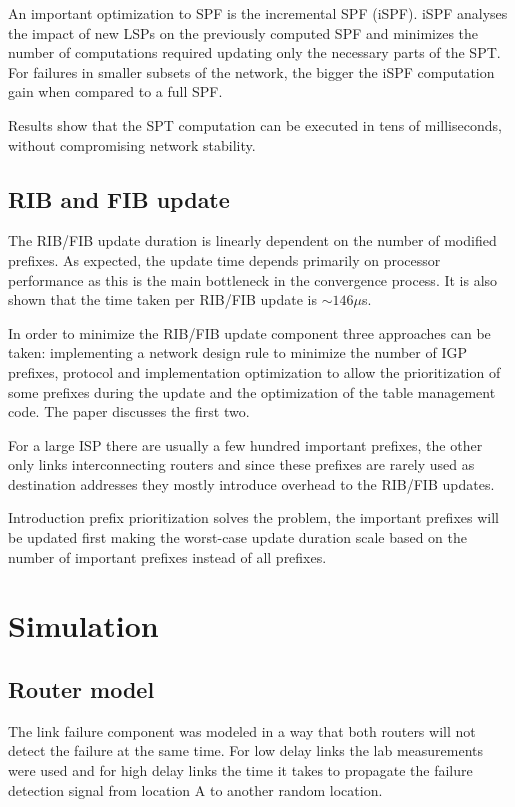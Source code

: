 \documentclass[a4paper, 11pt]{article}
\begin{document}
An important optimization to SPF is the incremental SPF (iSPF).
iSPF analyses the impact of new LSPs on the previously computed SPF and minimizes the number of computations required updating only the necessary parts of the SPT.
For failures in smaller subsets of the network, the bigger the iSPF computation gain when compared to a full SPF.

Results show that the SPT computation can be executed in tens of milliseconds, without compromising network stability.

\subsection{RIB and FIB update}
The RIB/FIB update duration is linearly dependent on the number of modified prefixes.
As expected, the update time depends primarily on processor performance as this is the main bottleneck in the convergence process.
It is also shown that the time taken per RIB/FIB update is $\sim146\mu$s.

In order to minimize the RIB/FIB update component three approaches can be taken: 
implementing a network design rule to minimize the number of IGP prefixes, protocol and implementation optimization to allow the prioritization of some prefixes during the update and the optimization of the table management code.
The paper discusses the first two.

For a large ISP there are usually a few hundred important prefixes, the other only links interconnecting routers and since these prefixes are rarely used as destination addresses they mostly introduce overhead to the RIB/FIB updates.

Introduction prefix prioritization solves the problem, the important prefixes will be updated first making
the worst-case update duration scale based on the number of important prefixes instead of all prefixes.

\section{Simulation}
\subsection{Router model}
The link failure component was modeled in a way that both routers will not detect the failure at the same time.
For low delay links the lab measurements were used and for high delay links the time it takes to propagate the failure detection signal from location A to another random location. %
\end{document}
